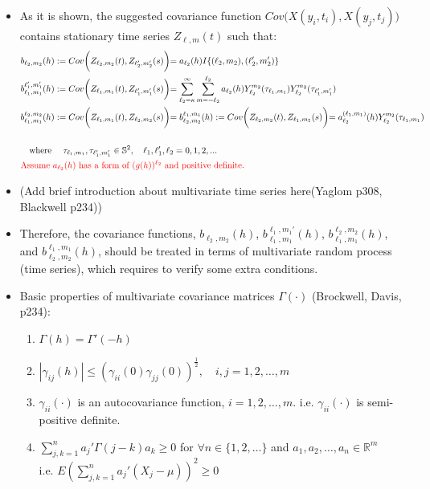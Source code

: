 \documentclass[11pt]{article}
\begin{document}
\begin{itemize}
\item
As it is shown, the suggested covariance function $Cov\biggl(X(y_i,t_i), X(y_j,t_j)\biggl)$ contains stationary time series $Z_{\ell,m}(t)$ such that:\\
\begin{align*}
&b_{\ell_2,m_2}(h) := Cov\biggl( Z_{\ell_2,m_2}(t), Z_{\ell_2',m_2'}(s) \biggl) = a_{\ell_2}(h) I\{(\ell_2,m_2),(\ell'_2,m_2')\}\\
&b_{\ell_1,m_1}^{\ell_1',m_1'}(h) := Cov\biggl( Z_{\ell_1,m_1}(t), Z_{\ell_1',m_1'}(s) \biggl) = \sum_{\ell_2=\kappa}^{\infty} \sum_{m=-\ell_2}^{\ell_2} a_{\ell_2}(h) Y_{\ell_2}^{m_2}(\tau_{\ell_1,m_1}) Y_{\ell_2}^{m_2}(\tau_{\ell_1',m_1'})\\
&b_{\ell_1,m_1}^{\ell_2,m_2}(h) := Cov\biggl( Z_{\ell_1,m_1}(t), Z_{\ell_2,m_2}(s) \biggl) = b_{\ell_2,m_2}^{\ell_1,m_1}(h) := Cov\biggl( Z_{\ell_2,m_2}(t), Z_{\ell_1,m_1}(s) \biggl) = a_{\ell_2}^{(\ell_1, m_1)}(h) Y_{\ell_2}^{m_2}(\tau_{\ell_1,m_1})\\
\\
&\quad \text{where } \quad \tau_{\ell_1,m_1}, \tau_{\ell_1',m_1'} \in \mathbb{S}^2, \quad \ell_1, \ell_1', \ell_2=0,1,2,...\\  
&{\color{red}\text{Assume } a_{\ell_2}(h) \text{ has a form of } (g(h))^{\ell_2} \text{ and positive definite.}}\\
\end{align*}

\item {\color{red} (Add brief introduction about multivariate time series here(Yaglom p308, Blackwell p234))}\\

\item Therefore, the covariance functions, $b_{\ell_2,m_2}(h)$, $b_{\ell_1,m_1}^{\ell_1,m_1'}(h)$, $b_{\ell_1,m_1}^{\ell_2,m_2}(h)$, and $b_{\ell_2,m_2}^{\ell_1,m_1}(h)$, should be treated in terms of multivariate random process (time series), which requires to verify some extra conditions.\\

\item Basic properties of multivariate covariance matrices $\Gamma(\cdot)$ (Brockwell, Davis, p234):\\
\begin{enumerate}
\item $\Gamma(h)=\Gamma'(-h)$
\item $|\gamma_{ij}(h)| \le (\gamma_{ii}(0) \gamma_{jj}(0))^{\frac{1}{2}}, \quad i,j=1,2,\dots, m$
\item $\gamma_{ii}(\cdot)$ is an autocovariance function, $i=1,2,\dots,m$.
i.e. $\gamma_{ii}(\cdot)$ is semi-positive definite.
\item $\sum_{j,k=1}^n a_j' \Gamma(j-k) a_k \ge 0$ for $\forall n \in \{1,2,\dots\}$ and $a_1,a_2,\dots,a_n \in \mathbb{R}^m$\\
i.e. $E(\sum_{j,k=1}^n a_j '(X_j-\mu))^2 \ge 0$\\
\end{enumerate}


\end{itemize}
\end{document}
